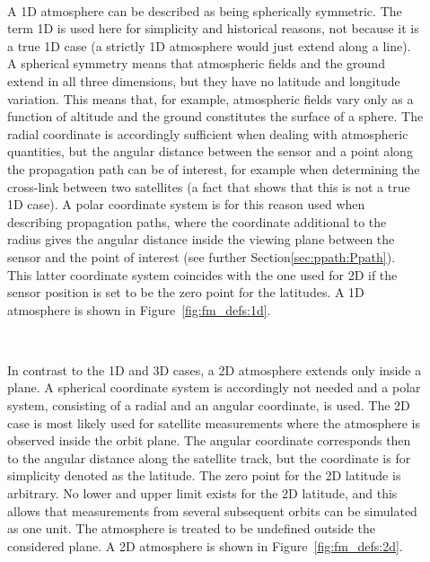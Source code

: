 \begin{description}
\item[\,\,\,] A 1D atmosphere can be described as being
  spherically symmetric. The term 1D is used here for simplicity and
  historical reasons, not because it is a true 1D case (a strictly 1D
  atmosphere would just extend along a line). A spherical symmetry
  means that atmospheric fields and the ground extend in all three
  dimensions, but they have no latitude and longitude variation. This
  means that, for example, atmospheric fields vary only as a function
  of altitude and the ground constitutes the surface of a sphere. The
  radial coordinate is accordingly sufficient when dealing with
  atmospheric quantities, but the angular distance between the sensor
  and a point along the propagation path can be of interest, for
  example when determining the cross-link between two satellites (a
  fact that shows that this is not a true 1D case). A polar coordinate
  system is for this reason used when describing propagation paths,
  where the coordinate additional to the radius gives the angular
  distance inside the viewing plane between the sensor and the point
  of interest (see further Section\ref{sec:ppath:Ppath}). This latter
  coordinate system coincides with the one used for 2D if the sensor
  position is set to be the zero point for the latitudes. A 1D
  atmosphere is shown in Figure~\ref{fig:fm_defs:1d}.
  
\item[\,\,\,] In contrast to the 1D and 3D cases, a 2D
  atmosphere extends only inside a plane. A spherical coordinate
  system is accordingly not needed and a polar system, consisting of a radial and an angular
  coordinate, is used. The 2D case is most likely used for satellite
  measurements where the atmosphere is observed inside the orbit
  plane. The angular coordinate corresponds then to the angular
  distance along the satellite track, but the coordinate is for
  simplicity denoted as the latitude. The zero point for the 2D
  latitude is arbitrary. No lower and upper limit exists for the 2D
  latitude, and this allows that measurements from several subsequent
  orbits can be simulated as one unit. The atmosphere is treated to be
  undefined outside the considered plane. A 2D atmosphere is shown in
  Figure~\ref{fig:fm_defs:2d}.

\end{description}

